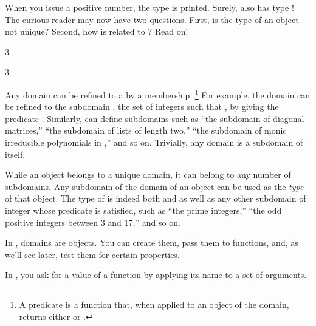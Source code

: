 \begin{xtc}
\begin{xtccomment}
When you issue a positive number, the type  is
printed.
Surely,  also has type !
The curious reader may now have two questions.
First, is the type of an object not unique?
Second, how is  related to ?
Read on!
\end{xtccomment}
\begin{spadsrc}
3
\end{spadsrc}
\begin{TeXOutput}
\begin{fricasmath}{5}
3%
\end{fricasmath}
\end{TeXOutput}
\end{xtc}

Any domain can be refined to a  by a membership
.\footnote{A predicate is a function that,
when applied to an object of the domain, returns either
 or .}
For example, the domain  can be refined to the
subdomain , the set of integers
 such that , by giving the \Language{}
predicate .
Similarly, \Language{} can define subdomains such as ``the
subdomain of diagonal matrices,'' ``the subdomain of lists of length
two,'' ``the subdomain of monic irreducible polynomials in
,'' and so on.
Trivially, any domain is a subdomain of itself.

While an object belongs to a unique domain, it can belong to any
number of subdomains.
Any subdomain of the domain of an object can be used as the
{\it type} of that object.
The type of  is indeed both  and
 as well as any other subdomain of
integer whose predicate is satisfied, such as ``the prime
integers,'' ``the odd positive integers between 3 and 17,'' and so
on.


In \Language{}, domains are objects.
You can create them, pass them to functions, and, as we'll see later, test
them for certain properties.

In \Language{}, you ask for a value of a function by applying its name
to a set of arguments.

